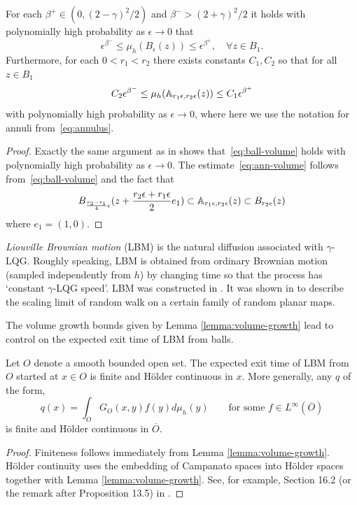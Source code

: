 \documentclass[12pt]{amsart}
\numberwithin{equation}{section}
\begin{document}
	
	\begin{lemma} \label{lemma:volume-growth}
		For each $\beta^+ \in (0, (2 -\gamma)^2/2)$ and $\beta^- > (2+\gamma)^2/2$
		it holds with polynomially high probability as $\epsilon \to 0$ that  
		\begin{equation} \label{eq:ball-volume}
		\epsilon^{\beta^-} \leq \mu_h(B_\epsilon(z)) \leq \epsilon^{\beta^+} ,\quad\forall z \in B_1 .
		\end{equation}
		Furthermore, for each $0 < r_1 < r_2$ there exists constants $C_1, C_2$ so that for all $z \in B_1$
		\begin{equation} \label{eq:ann-volume}
		C_2 \epsilon^{\beta^-} \leq \mu_h(\mathbb{A}_{r_1 \epsilon, r_2 \epsilon}(z)) \leq C_1 \epsilon^{\beta^+}
		\end{equation}
		with polynomially high probability as $\epsilon \to 0$, where here we use the notation for annuli from~\eqref{eq:annulus}.
	\end{lemma}
	\begin{proof}
		Exactly the same argument as in \cite[Lemma A.1]{berestycki2020random} shows that~\eqref{eq:ball-volume} holds with polynomially high probability as $\epsilon \to 0$. The estimate~\eqref{eq:ann-volume} follows from~\eqref{eq:ball-volume} and the fact that
		\[
		B_{\frac{r_2-r_1}{4} \epsilon}(z + \frac{r_2\epsilon+r_1\epsilon}{2}  e_1) \subset \mathbb{A}_{r_1 \epsilon, r_2 \epsilon}(z) \subset B_{r_2 \epsilon}(z)
		\]
		where $e_1 = (1,0)$. 
	\end{proof}
	
	
	
	\textit{Liouville Brownian motion} (LBM) is the natural diffusion associated with $\gamma$-LQG. Roughly speaking, LBM is obtained from ordinary Brownian motion (sampled independently from $h$) by changing time so that the process has `constant $\gamma$-LQG speed'. LBM was constructed in \cite{berestycki2015diffusion, garban2016liouville}. It was shown in \cite{berestycki2020random} to describe the scaling limit of random walk on a certain family of random planar maps. 
	
	The volume growth bounds given by Lemma \ref{lemma:volume-growth} lead to control 
	on the expected exit time of LBM from balls. 
	
	\begin{prop} \label{prop:lbm-exit-time}
		Let $O$ denote a smooth bounded open set. 
		The expected exit time of LBM from $O$ started at $x \in O$
		is finite and H\"{o}lder continuous in $x$.  More generally, any $q$ of the form,
		\[
		q(x) = \int_{O} G_{O}(x, y) f (y) d \mu_h(y) \qquad \mbox{for some $f \in L^{\infty}(\overline O)$}
		\]
		is finite and H\"{o}lder continuous in $\overline{O}$.
	\end{prop}
	\begin{proof}		
		Finiteness follows immediately from Lemma \ref{lemma:volume-growth}.
		H\"{o}lder continuity uses the embedding of Campanato spaces into H\"{o}lder spaces together with Lemma \ref{lemma:volume-growth}. 
		See, for example, Section 16.2 (or the remark after Proposition 13.5) in \cite{ponce2016elliptic}. 
	\end{proof}
	
\end{document}
